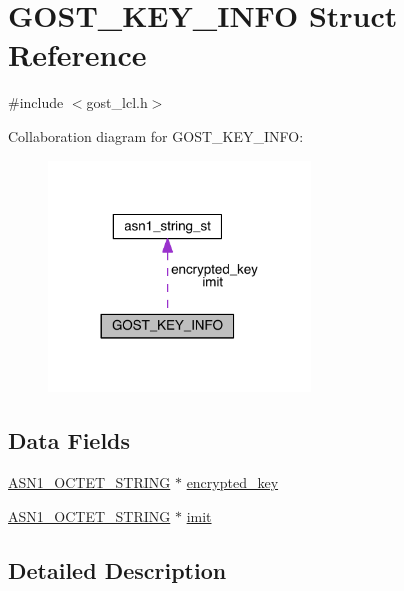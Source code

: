\hypertarget{struct_g_o_s_t___k_e_y___i_n_f_o}{}\section{G\+O\+S\+T\+\_\+\+K\+E\+Y\+\_\+\+I\+N\+FO Struct Reference}
\label{struct_g_o_s_t___k_e_y___i_n_f_o}


{\ttfamily \#include $<$gost\+\_\+lcl.\+h$>$}



Collaboration diagram for G\+O\+S\+T\+\_\+\+K\+E\+Y\+\_\+\+I\+N\+FO\+:\nopagebreak
\begin{figure}[H]
\begin{center}
\leavevmode
\includegraphics[width=197pt]{struct_g_o_s_t___k_e_y___i_n_f_o__coll__graph}
\end{center}
\end{figure}
\subsection*{Data Fields}
\begin{DoxyCompactItemize}
\item 
\hyperlink{crypto_2ossl__typ_8h_afbd05e94e0f0430a2b729473efec88c1}{A\+S\+N1\+\_\+\+O\+C\+T\+E\+T\+\_\+\+S\+T\+R\+I\+NG} $\ast$ \hyperlink{struct_g_o_s_t___k_e_y___i_n_f_o_a8160e48d5f00b831547bd1c9eadec0c0}{encrypted\+\_\+key}
\item 
\hyperlink{crypto_2ossl__typ_8h_afbd05e94e0f0430a2b729473efec88c1}{A\+S\+N1\+\_\+\+O\+C\+T\+E\+T\+\_\+\+S\+T\+R\+I\+NG} $\ast$ \hyperlink{struct_g_o_s_t___k_e_y___i_n_f_o_a79f1a28e806a36020b87c992cacd82b9}{imit}
\end{DoxyCompactItemize}


\subsection{Detailed Description}


